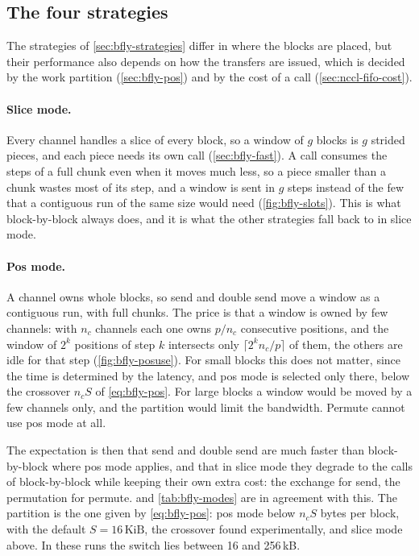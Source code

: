 \FloatBarrier
\subsection{The four strategies}\label{sec:bfly-res-modes}

The strategies of \cref{sec:bfly-strategies} differ in where the blocks are placed, but their performance also depends on how the transfers are issued, which is decided by the work partition (\cref{sec:bfly-pos}) and by the cost of a call (\cref{sec:nccl-fifo-cost}).

\paragraph{Slice mode.}
Every channel handles a slice of every block, so a window of $g$ blocks is $g$ strided pieces, and each piece needs its own call (\cref{sec:bfly-fast}).
A call consumes the steps of a full chunk even when it moves much less, so a piece smaller than a chunk wastes most of its step, and a window is sent in $g$ steps instead of the few that a contiguous run of the same size would need (\cref{fig:bfly-slots}).
This is what block-by-block always does, and it is what the other strategies fall back to in slice mode.

\paragraph{Pos mode.}
A channel owns whole blocks, so send and double send move a window as a contiguous run, with full chunks.
The price is that a window is owned by few channels: with $n_c$ channels each one owns $p/n_c$ consecutive positions, and the window of $2^k$ positions of step $k$ intersects only $\lceil 2^k n_c/p\rceil$ of them, the others are idle for that step (\cref{fig:bfly-posuse}).
For small blocks this does not matter, since the time is determined by the latency, and pos mode is selected only there, below the crossover $n_cS$ of \cref{eq:bfly-pos}. For large blocks a window would be moved by a few channels only, and the partition would limit the bandwidth.
Permute cannot use pos mode at all.

The expectation is then that send and double send are much faster than block-by-block where pos mode applies, and that in slice mode they degrade to the calls of block-by-block while keeping their own extra cost: the exchange for send, the permutation for permute.
 and \cref{tab:bfly-modes} are in agreement with this.
The partition is the one given by \cref{eq:bfly-pos}: pos mode below $n_cS$ bytes per block, with the default $S=16\,\text{KiB}$, the crossover found experimentally, and slice mode above.
In these runs the switch lies between 16 and 256\,kB.

